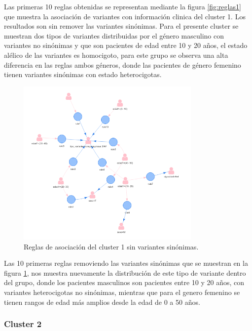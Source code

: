 Las primeras 10 reglas obtenidas se representan mediante la figura \ref{fig:reglas1} que muestra la asociación de variantes con información clinica del cluster 1. Los resultados son sin remover las variantes sinónimas. Para el presente cluster se muestran dos tipos de variantes  distribuidas por el género masculino con variantes no sinónimas y que son pacientes de edad entre 10 y 20 años, el estado alélico de las variantes es homocigoto, para este grupo se observa una alta diferencia en las reglas ambos géneros, donde las pacientes de género femenino tienen variantes sinónimas con estado heterocigotas.

\begin{figure}[H]
	\centering
	\includegraphics[width=0.8\textwidth]{Kap4/reglas1_2}
	\caption{Reglas de asociación del cluster 1 sin variantes sinónimas.} \label{fig:reglas2}
\end{figure}

Las 10 primeras reglas removiendo las variantes sinónimas que se muestran en la figura  \ref{fig:reglas2}, nos muestra nuevamente la distribución de este tipo de variante dentro del grupo, donde los pacientes masculinos son pacientes entre 10 y 20 años, con variantes heterocigotas no sinónimas, mientras que para el genero femenino se tienen rangos de edad más amplios desde la edad  de 0 a 50 años.

\subsubsection*{Cluster 2}

